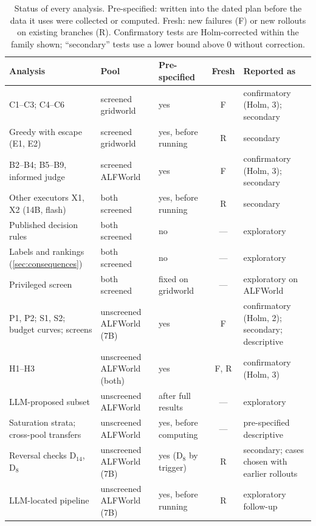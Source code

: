 \documentclass{article}
\theoremstyle{plain}
\theoremstyle{definition}
\theoremstyle{remark}
\begin{document}
\begin{table}[t]
  \caption{Status of every analysis. Pre-specified: written into the dated plan before the data it uses were collected or computed. Fresh: new failures (F) or new rollouts on existing branches (R). Confirmatory tests are Holm-corrected within the family shown; ``secondary'' tests use a lower bound above 0 without correction.}
  \label{tab:audit}
  \centering
  \footnotesize
  \setlength{\tabcolsep}{4pt}
  \begin{tabular}{@{}>{\raggedright\arraybackslash}p{}>{\raggedright\arraybackslash}p{}>{\raggedright\arraybackslash}p{}c>{\raggedright\arraybackslash}p{}@{}}
    \toprule
    Analysis & Pool & Pre-specified & Fresh & Reported as \\
    \midrule
    C1--C3; C4--C6 & screened gridworld & yes & F & confirmatory (Holm, 3); secondary \\
    Greedy with escape (E1, E2) & screened gridworld & yes, before running & R & secondary \\
    B2--B4; B5--B9, informed judge & screened ALFWorld & yes & F & confirmatory (Holm, 3); secondary \\
    Other executors X1, X2 (14B, flash) & both screened & yes, before running & R & secondary \\
    Published decision rules & both screened & no & --- & exploratory \\
    Labels and rankings (\cref{sec:consequences}) & both screened & no & --- & exploratory \\
    Privileged screen & both screened & fixed on gridworld & --- & exploratory on ALFWorld \\
    P1, P2; S1, S2; budget curves; screens & unscreened ALFWorld (7B) & yes & F & confirmatory (Holm, 2); secondary; descriptive \\
    H1--H3 & unscreened ALFWorld (both) & yes & F, R & confirmatory (Holm, 3) \\
    LLM-proposed subset & unscreened ALFWorld & after full results & --- & exploratory \\
    Saturation strata; cross-pool transfers & unscreened ALFWorld & yes, before computing & --- & pre-specified descriptive \\
    Reversal checks D$_{14}$, D$_{8}$ & unscreened ALFWorld (7B) & yes (D$_8$ by trigger) & R & secondary; cases chosen with earlier rollouts \\
    LLM-located pipeline & unscreened ALFWorld (7B) & yes, before running & R & exploratory follow-up \\

\end{tabular}
\end{table}
\end{document}
